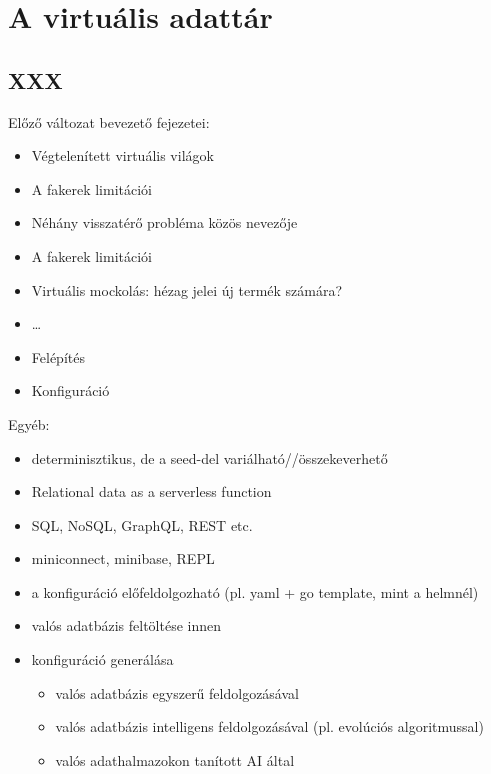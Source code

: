 \documentclass[
    parspace,
    noindent,
    nohyp,
]{elteiktdk}[2023/04/10]
\begin{document}
















\chapter{A virtuális adattár}









\section{XXX}



Előző változat bevezető fejezetei:

\begin{itemize}
    \item Végtelenített virtuális világok
    \item A fakerek limitációi
    \item Néhány visszatérő probléma közös nevezője
    \item A fakerek limitációi
    \item Virtuális mockolás: hézag jelei új termék számára?
    \item \dots
    \item Felépítés
    \item Konfiguráció
\end{itemize}

Egyéb:

\begin{itemize}
    \item determinisztikus, de a seed-del variálható//összekeverhető
    \item Relational data as a serverless function
    \item SQL, NoSQL, GraphQL, REST etc.
    \item miniconnect, minibase, REPL
    \item a konfiguráció előfeldolgozható (pl. yaml + go template, mint a helmnél)
    \item valós adatbázis feltöltése innen
    \item konfiguráció generálása
    \begin{itemize}
        \item valós adatbázis egyszerű feldolgozásával
        \item valós adatbázis intelligens feldolgozásával (pl. evolúciós algoritmussal)
        \item valós adathalmazokon tanított AI által
    \end{itemize}
\end{itemize}
\end{document}
